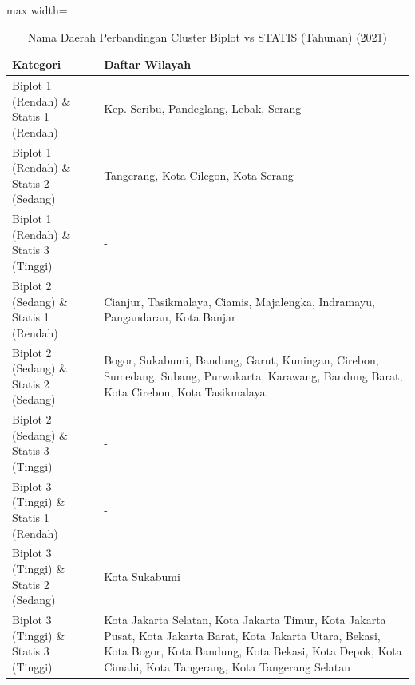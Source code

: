 \begin{table}[H]
\centering
\caption{Nama Daerah Perbandingan Cluster Biplot vs STATIS (Tahunan) (2021)} \label{tab:app1biplot_statis_comp_name_2021}
\begin{adjustbox}{max width=\textwidth}
\begin{tabular}{|p{4cm}|p{10cm}|}
\hline
\textbf{Kategori} & \textbf{Daftar Wilayah} \\
\hline
Biplot 1 (Rendah) \& Statis 1 (Rendah) & Kep. Seribu, Pandeglang, Lebak, Serang \\
\hline
Biplot 1 (Rendah) \& Statis 2 (Sedang) & Tangerang, Kota Cilegon, Kota Serang \\
\hline
Biplot 1 (Rendah) \& Statis 3 (Tinggi) & - \\
\hline
Biplot 2 (Sedang) \& Statis 1 (Rendah) & Cianjur, Tasikmalaya, Ciamis, Majalengka, Indramayu, Pangandaran, Kota Banjar \\
\hline
Biplot 2 (Sedang) \& Statis 2 (Sedang) & Bogor, Sukabumi, Bandung, Garut, Kuningan, Cirebon, Sumedang, Subang, Purwakarta, Karawang, Bandung Barat, Kota Cirebon, Kota Tasikmalaya \\
\hline
Biplot 2 (Sedang) \& Statis 3 (Tinggi) & - \\
\hline
Biplot 3 (Tinggi) \& Statis 1 (Rendah) & - \\
\hline
Biplot 3 (Tinggi) \& Statis 2 (Sedang) & Kota Sukabumi \\
\hline
Biplot 3 (Tinggi) \& Statis 3 (Tinggi) & Kota Jakarta Selatan, Kota Jakarta Timur, Kota Jakarta Pusat, Kota Jakarta Barat, Kota Jakarta Utara, Bekasi, Kota Bogor, Kota Bandung, Kota Bekasi, Kota Depok, Kota Cimahi, Kota Tangerang, Kota Tangerang Selatan \\
\hline
\end{tabular}
\end{adjustbox}
\end{table}
